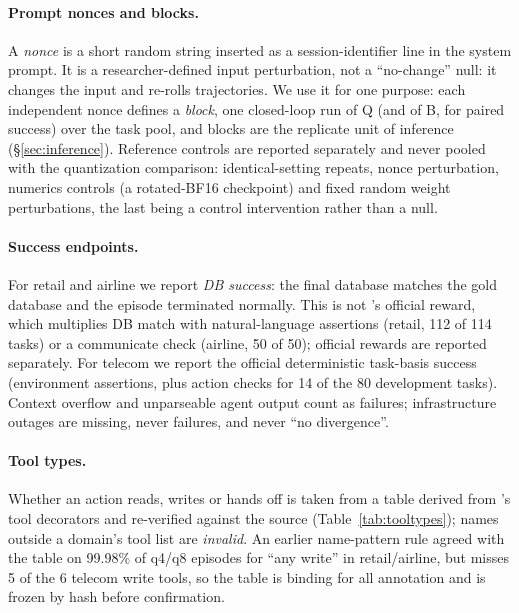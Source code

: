 \paragraph{Prompt nonces and blocks.} A \emph{nonce} is a short random string inserted as a session-identifier line in the system prompt. It is a researcher-defined input perturbation, not a ``no-change'' null: it changes the input and re-rolls trajectories. We use it for one purpose: each independent nonce defines a \emph{block}, one closed-loop run of Q (and of B, for paired success) over the task pool, and blocks are the replicate unit of inference (\S\ref{sec:inference}). Reference controls are reported separately and never pooled with the quantization comparison: identical-setting repeats, nonce perturbation, numerics controls (a rotated-BF16 checkpoint) and fixed random weight perturbations, the last being a control intervention rather than a null. 

\paragraph{Success endpoints.} For retail and airline we report \emph{DB success}: the final database matches the gold database and the episode terminated normally. This is not \tautwo{}'s official reward, which multiplies DB match with natural-language assertions (retail, 112 of 114 tasks) or a communicate check (airline, 50 of 50); official rewards are reported separately. For telecom we report the official deterministic task-basis success (environment assertions, plus action checks for 14 of the 80 development tasks). Context overflow and unparseable agent output count as failures; infrastructure outages are missing, never failures, and never ``no divergence''.

\paragraph{Tool types.} Whether an action reads, writes or hands off is taken from a table derived from \tautwo{}'s tool decorators and re-verified against the source (Table~\ref{tab:tooltypes}); names outside a domain's tool list are \emph{invalid}. An earlier name-pattern rule agreed with the table on 99.98\% of q4/q8 episodes for ``any write'' in retail/airline, but misses 5 of the 6 telecom write tools, so the table is binding for all annotation and is frozen by hash before confirmation.

